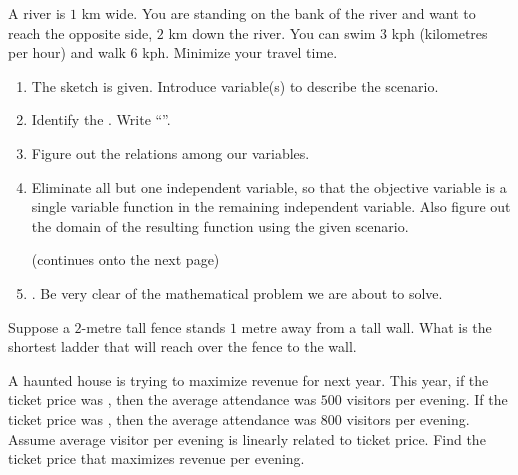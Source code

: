 \documentclass[../main.tex]{subfiles}
\begin{document}
\begin{example} \label{ex:optimization-swim}
  A  river is \(1\) km wide. You are standing on the bank of the river and want to reach the opposite side, \(2\) km down the river. You can swim \(3\) kph (kilometres per hour) and walk \(6\) kph. Minimize your travel time.

  \hfill{}
  

  \begin{enumerate}
    \item The sketch is given. Introduce variable(s) to describe the scenario.


    \item Identify the . Write ``''. 


    \item Figure out the relations among our variables. 


    \item Eliminate all but one independent variable, so that the objective variable is a single variable function in the remaining independent variable. Also figure out the domain of the resulting function using the given scenario.


      \vfill{}{\footnotesize (continues onto the next page)} \clearpage

    \item {}. Be very clear of the mathematical problem we are about to solve.

  \end{enumerate}
\end{example}
\clearpage

\begin{example} \label{ex:optimization-ladder}
  Suppose a \(2\)-metre tall fence stands \(1\) metre away from a tall wall.  What is the shortest ladder that will reach over the fence to the wall.

\end{example}
\clearpage

\begin{example}
  A haunted house is trying to maximize revenue for next year. This year, if the ticket price was , then the average attendance was \(500\) visitors per evening. If the ticket price was , then the average attendance was \(800\) visitors per evening.  Assume average visitor per evening is linearly related to ticket price. Find the ticket price that maximizes revenue per evening. 

\end{example}
\clearpage
\end{document}
